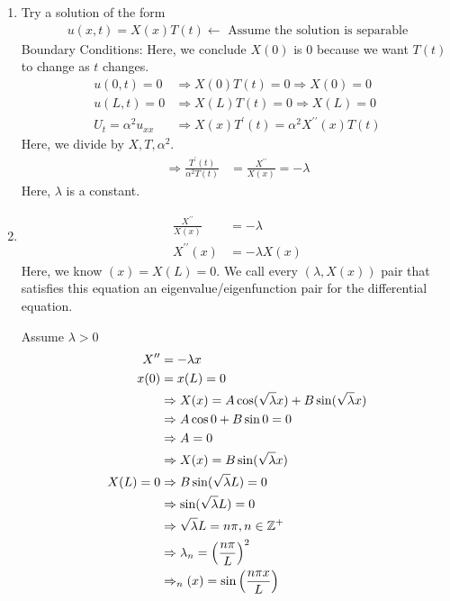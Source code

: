 \documentclass{article}
\begin{document}
\begin{enumerate}
  \item Try a solution of the form
  \begin{align}
    u(x, t) = X(x)T(t) \leftarrow \text{ Assume the solution is separable}
  \end{align}
  Boundary Conditions:
  Here, we conclude $X(0)$ is $0$ because we want $T(t)$ to change as $t$ changes.
  \begin{align}
    u(0, t) = 0 & \Rightarrow X(0)T(t) = 0 \Rightarrow X(0) = 0\\
    u(L, t) = 0 & \Rightarrow X(L)T(t) = 0 \Rightarrow X(L) = 0\\
    U_t = \alpha^2 u_{xx} & \Rightarrow X(x)T^\prime(t) = \alpha^2 X^{\prime\prime}(x) T(t)
  \end{align}
  Here, we divide by $X, T, \alpha^2$.
  \begin{align}
    \Rightarrow \frac{T^\prime(t)}{\alpha^2T(t)} & = \frac{X^{\prime\prime}}{X(x)} = -\lambda
  \end{align}
  Here, $\lambda$ is a constant.
  \item
  \begin{align}
    \frac{X^{\prime\prime}}{X(x)} & = -\lambda\\
    X^{\prime\prime}(x) & = -\lambda X(x)
  \end{align}
  Here, we know $(x) = X(L) = 0$. We call every $(\lambda, X(x))$ pair that satisfies this equation an eigenvalue/eigenfunction pair for the differential equation.

  Assume $\lambda > 0$
  \begin{align}
    X^{\prime\prime} & = -\lambda x\\
    x(0) & = x(L) = 0\\
    & \Rightarrow X(x) = A \cos(\sqrt{\lambda} x) + B\sin(\sqrt{\lambda} x)\\
    & \Rightarrow A \cos 0 + B \sin 0 = 0\\
    & \Rightarrow A = 0\\
    & \Rightarrow X(x) = B \sin(\sqrt \lambda x)\\
    X(L) = 0 & \Rightarrow B \sin(\sqrt \lambda L) = 0\\
    & \Rightarrow \sin(\sqrt \lambda L) = 0\\
    & \Rightarrow \sqrt \lambda L = n \pi, n \in \mathbb Z^+\\
    & \Rightarrow \lambda_n = \Big( \frac{n \pi}{L} \Big)^2\\
    & \Rightarrow_n(x) = \sin \Big( \frac{n \pi x}{L} \Big)
  \end{align}
\end{enumerate}
\end{document}

